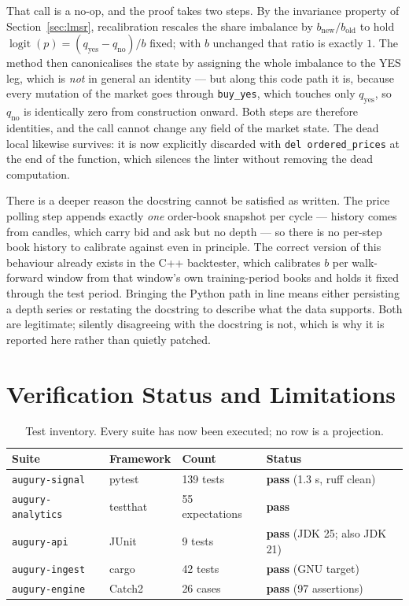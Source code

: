 \documentclass[11pt]{article}
\newcommand{\code}[1]{\texttt{\small #1}}
\begin{document}
That call is a no-op, and the proof takes two steps. By the invariance property
of Section~\ref{sec:lmsr}, recalibration rescales the share imbalance by
$b_{\text{new}}/b_{\text{old}}$ to hold
$\operatorname{logit}(p) = (q_{\text{yes}} - q_{\text{no}})/b$ fixed; with $b$
unchanged that ratio is exactly $1$. The method then canonicalises the state by
assigning the whole imbalance to the YES leg, which is \emph{not} in general an
identity --- but along this code path it is, because every mutation of the
market goes through \code{buy\_yes}, which touches only $q_{\text{yes}}$, so
$q_{\text{no}}$ is identically zero from construction onward. Both steps are
therefore identities, and the call cannot change any field of the market state.
The dead local likewise survives: it is now explicitly discarded with
\code{del ordered\_prices} at the end of the function, which silences the linter
without removing the dead computation.

There is a deeper reason the docstring cannot be satisfied as written. The price
polling step appends exactly \emph{one} order-book snapshot per cycle --- history
comes from candles, which carry bid and ask but no depth --- so there is no
per-step book history to calibrate against even in principle. The correct
version of this behaviour already exists in the C++ backtester, which calibrates
$b$ per walk-forward window from that window's own training-period books and
holds it fixed through the test period. Bringing the Python path in line means
either persisting a depth series or restating the docstring to describe what the
data supports. Both are legitimate; silently disagreeing with the docstring is
not, which is why it is reported here rather than quietly patched.

\section{Verification Status and Limitations}
\label{sec:limits}

\begin{table}[htbp]
\centering
\caption[Test inventory]{Test inventory. Every suite has now been executed; no row is a
projection.}
\label{tab:tests}
\small
\begin{tabular}{@{}llll@{}}
\toprule
Suite & Framework & Count & Status \\
\midrule
\code{augury-signal} & pytest   & 139 tests & \textbf{pass} (1.3 s, ruff clean) \\
\code{augury-analytics} & testthat & 55 expectations & \textbf{pass} \\
\code{augury-api}    & JUnit    & 9 tests   & \textbf{pass} (JDK 25; also JDK 21) \\
\code{augury-ingest} & cargo    & 42 tests  & \textbf{pass} (GNU target) \\
\code{augury-engine} & Catch2   & 26 cases  & \textbf{pass} (97 assertions) \\
\bottomrule
\end{tabular}
\end{table}
\end{document}
